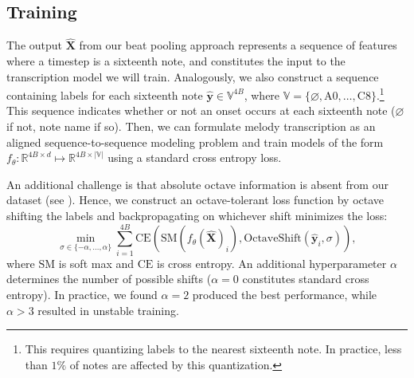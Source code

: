 \subsection{Training}

The output $\hat{\bm{X}}$ from our beat pooling approach represents a sequence of features where a timestep is a sixteenth note, and constitutes the input to the transcription model we will train. 
Analogously, we also construct a sequence containing labels for each sixteenth note ${\hat{\bm{y}} \in \mathbb{V}^{4B}}$, where 
${\mathbb{V} = \{\varnothing, \text{A0}, \ldots, \text{C8}\}}$.\footnote{This requires quantizing labels to the nearest sixteenth note. In practice, less than $1\%$ of notes are affected by this quantization.
} 
This sequence indicates whether or not an onset occurs at each sixteenth note ($\varnothing$ if not, note name if so). 
Then, we can formulate melody transcription as an aligned sequence-to-sequence modeling problem and train models of the form ${f_{\theta} : \mathbb{R}^{4B \times d} \mapsto \mathbb{R}^{4B \times |\mathbb{V}|}}$ using a standard cross entropy loss. 

An additional challenge is that absolute octave information is absent from our dataset (see ). 
Hence, we construct an octave-tolerant loss function by octave shifting the labels and backpropagating on whichever shift minimizes the loss:
\begin{equation*}
\operatorname*{min}_{\sigma \in \{-\alpha, \ldots, \alpha\}} \sum_{i=1}^{4B} \text{CE}(\text{SM}(f_{\theta}(\bm{\hat{X}})_i), \text{OctaveShift}(\hat{\bm{y}}_i, \sigma)), 
\end{equation*}
where $\text{SM}$ is soft max and $\text{CE}$ is cross entropy. 
An additional hyperparameter $\alpha$ determines the number of possible shifts (${\alpha = 0}$ constitutes standard cross entropy). 
In practice, we found ${\alpha = 2}$ produced the best performance, 
while ${\alpha > 3}$ resulted in unstable training.
